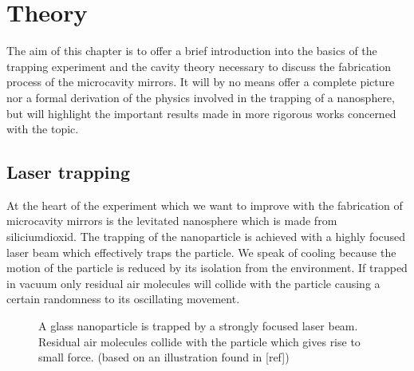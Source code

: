\chapter{Theory}
The aim of this chapter is to offer a brief introduction into the basics of the trapping experiment and the cavity theory necessary to discuss the fabrication process of the microcavity mirrors. It will by no means offer a complete picture nor a formal derivation of the physics involved in the trapping of a nanosphere, but will highlight the important results made in more rigorous works concerned with the topic.

\section{Laser trapping}\label{ChapLaserTrapping}
At the heart of the experiment which we want to improve with the fabrication of microcavity mirrors is the levitated nanosphere which is made from siliciumdioxid. The trapping of the nanoparticle is achieved with a highly focused laser beam which effectively traps the particle. We speak of cooling because the motion of the particle is reduced by its isolation from the environment. If trapped in vacuum only residual air molecules will collide with the particle causing a certain randomness to its oscillating movement.

\begin{figure}[H]
	
	\caption{A glass nanoparticle is trapped by a strongly focused laser beam. Residual air molecules collide with the particle which gives rise to small force. (based on an illustration found in [ref])}
\end{figure}

